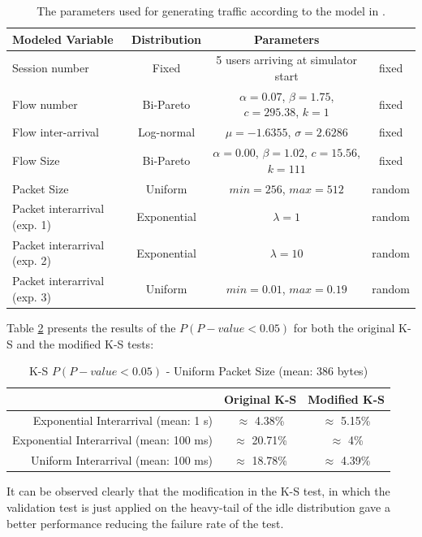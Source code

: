 \begin{table}[h!]
	\begin{center}
		\begin{tabular}{ l | c | c c }
			Modeled Variable & Distribution & Parameters & \\ \hline
			Session number	& Fixed & 5 users arriving at simulator start & fixed\\
			Flow number & Bi-Pareto & $\alpha = 0.07$, $\beta = 1.75$, $c = 295.38$, $k = 1$ & fixed\\
			Flow inter-arrival & Log-normal & $\mu = -1.6355$, $\sigma = 2.6286$ & fixed\\
			Flow Size & Bi-Pareto & $\alpha = 0.00$, $\beta = 1.02$, $c = 15.56$, $k = 111$ & fixed\\
			Packet Size & Uniform & $min = 256$, $max = 512$ & random\\
			Packet interarrival (exp. 1) & Exponential & $\lambda = 1$ & random\\
			Packet interarrival (exp. 2) & Exponential & $\lambda = 10$ & random\\
			Packet interarrival (exp. 3) & Uniform & $min = 0.01$, $max = 0.19$ & random\\
		\end{tabular}
		\caption{The parameters used for generating traffic according to the model in \cite{Campus-WLAN}.}
		\label{table:KS_traffic}
	\end{center}
\end{table}

Table \ref{table:KS} presents the results of the ${P(P-value<0.05)}$ for both the original \acs{K-S} and the modified \acs{K-S} tests:

\begin{table}[h!]
	\centering
	\begin{tabular}{ r | c | c }
		& Original \acs{K-S} & Modified \acs{K-S} \\ \hline
		Exponential Interarrival (mean: 1 s) & $\approx$ 4.38\% & $\approx$ 5.15\% \\ 
		Exponential Interarrival (mean: 100 ms) & $\approx$ 20.71\% & $\approx$ 4\% \\ 
		Uniform Interarrival (mean: 100 ms) & $\approx$ 18.78\% & $\approx$ 4.39\% \\ 
	\end{tabular}
	\caption{\acs{K-S} ${P(P-value<0.05)}$ - Uniform Packet Size (mean: 386 bytes)}
	\label{table:KS}
\end{table}

It can be observed clearly that the modification in the \acs{K-S} test, in which the validation test is just applied on the heavy-tail of the idle distribution gave a better performance reducing the failure rate of the test.

